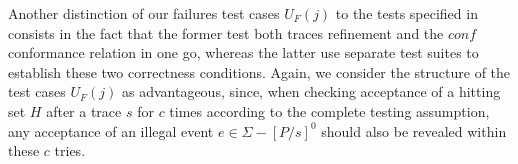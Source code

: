 \documentclass[3p,times]{elsarticle}
\newcommand{\epass}{{\text{\it pass}}}
\newcommand{\efail}{{\text{\it fail}}}
\begin{document}
Another distinction of our failures test cases $U_F(j)$ to the tests
specified in~\cite{DBLP:conf/icfem/CavalcantiG07} consists in the fact that
the former test both traces refinement and the $conf$ conformance relation in
one go, whereas the latter use separate test suites to establish these two
correctness conditions. Again, we consider the structure of the  test cases
$U_F(j)$ as advantageous, since, when checking acceptance of a hitting set
$H$ after a trace $s$ for $c$ times according to the complete testing
assumption, any acceptance of an illegal event $e\in\Sigma - [P/s]^0$ should
also be revealed within these $c$ tries.


%

\end{document}
